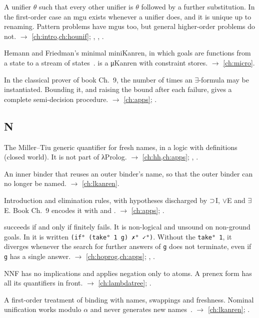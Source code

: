 \begin{glossarylist}
\item[Most general unifier (mgu)] A unifier $\theta$ such that every other unifier is $\theta$ followed by a
  further substitution. In the first-order case an mgu exists whenever a unifier does, and it is unique up to
  renaming. Pattern problems have mgus too, but general higher-order problems do not.
  $\rightarrow$ \cref{ch:intro,ch:hounif}; , , .
\item[μKanren] Hemann and Friedman's minimal miniKanren, in which goals are functions from a state to a stream of
  states~\cite{HemannFriedman2013}. \micro{} is a μKanren with constraint stores. $\rightarrow$ \cref{ch:micro}.
\item[Multiplicity] In the classical prover of book Ch.~9, the number of times an $\exists$-formula may be
  instantiated. Bounding it, and raising the bound after each failure, gives a complete semi-decision procedure.
  $\rightarrow$ \cref{ch:apps}; .
\end{glossarylist}

\subsection*{N}
\begin{glossarylist}
\item[$\nabla$ (nabla)] The Miller--Tiu generic quantifier for fresh names, in a logic with definitions (closed
  world). It is not part of λProlog. $\rightarrow$ \cref{ch:hh,ch:apps}; , .
\item[Name shadowing] An inner binder that reuses an outer binder's name, so that the outer binder can no longer be
  named. $\rightarrow$ \cref{ch:lkanren}.
\item[Natural deduction] Introduction and elimination rules, with hypotheses discharged by $\supset$I, $\vee$E and
  $\exists$E. Book Ch.~9 encodes it with \lp{=>} and . $\rightarrow$ \cref{ch:apps}; .
\item[Negation-as-failure]  succeeds if and only if  finitely fails. It is non-logical and unsound
  on non-ground goals. In \micro{} it is written \texttt{(if° (take° 1 g) ✗° ✓°)}. Without the \texttt{take° 1},
  it diverges whenever the search for further answers of \texttt{g} does not terminate, even if \texttt{g} has a
  single answer. $\rightarrow$ \cref{ch:hoprog,ch:apps}; ,
  .
\item[Negation normal form, prenex normal form] NNF has no implications and applies negation only to atoms. A
  prenex form has all its quantifiers in front. $\rightarrow$ \cref{ch:lambdatree}; .
\item[Nominal logic, nominal unification] A first-order treatment of binding with names, swappings and freshness.
  Nominal unification works modulo $\alpha$ and never generates new names~\cite{UrbanPittsGabbay2004}.
  $\rightarrow$ \cref{ch:lkanren}; .
\end{glossarylist}

